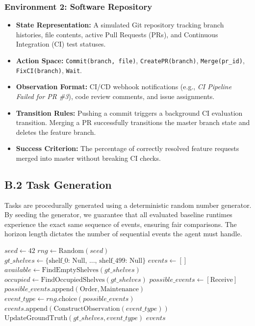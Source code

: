 \documentclass[11pt]{article}
\begin{document}
\subsubsection*{Environment 2: Software Repository}
\begin{itemize}
    \item \textbf{State Representation:} A simulated Git repository tracking branch histories, file contents, active Pull Requests (PRs), and Continuous Integration (CI) test statuses.
    \item \textbf{Action Space:} \texttt{Commit(branch, file)}, \texttt{CreatePR(branch)}, \texttt{Merge(pr\_id)}, \texttt{FixCI(branch)}, \texttt{Wait}.
    \item \textbf{Observation Format:} CI/CD webhook notifications (e.g., \textit{CI Pipeline Failed for PR \#3}), code review comments, and issue assignments.
    \item \textbf{Transition Rules:} Pushing a commit triggers a background CI evaluation transition. Merging a PR successfully transitions the master branch state and deletes the feature branch.
    \item \textbf{Success Criterion:} The percentage of correctly resolved feature requests merged into master without breaking CI checks.
\end{itemize}

\subsection*{B.2 Task Generation}

Tasks are procedurally generated using a deterministic random number generator. By seeding the generator, we guarantee that all evaluated baseline runtimes experience the exact same sequence of events, ensuring fair comparisons. The horizon length dictates the number of sequential events the agent must handle.

\begin{algorithm}[h]
\caption{Warehouse Task Generation Pseudo-code}
\begin{algorithmic}[1]
\State $seed \gets 42$
\State $rng \gets \text{Random}(seed)$
\State $gt\_shelves \gets \{ \text{shelf\_0: Null, ..., shelf\_499: Null} \}$
\State $events \gets []$
    \State $available \gets \text{FindEmptyShelves}(gt\_shelves)$
    \State $occupied \gets \text{FindOccupiedShelves}(gt\_shelves)$
    \State $possible\_events \gets [\text{Receive}]$
        \State $possible\_events\text{.append}(\text{Order}, \text{Maintenance})$
    \EndIf
    \State $event\_type \gets rng\text{.choice}(possible\_events)$
    \State $events\text{.append}(\text{ConstructObservation}(event\_type))$
    \State $\text{UpdateGroundTruth}(gt\_shelves, event\_type)$
\EndFor
\State \Return $events$
\end{algorithmic}
\end{algorithm}
\end{document}
